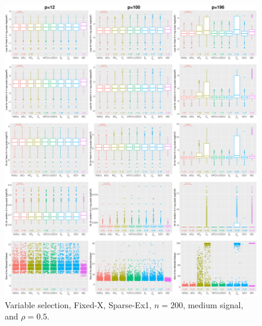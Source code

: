 \begin{figure}[!ht]
\centering
\includegraphics[width=\textwidth]{figures/supplement/fixedx/subset_selection/Sparse-Ex1_n200_msnr_rho05.eps}
\caption{Variable selection, Fixed-X, Sparse-Ex1, $n=200$, medium signal, and $\rho=0.5$.}
\end{figure}
\clearpage
